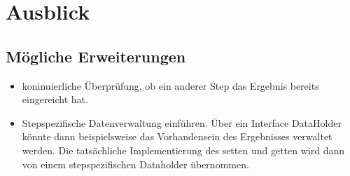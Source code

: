 \chapter{Ausblick}
\section{Mögliche Erweiterungen}
\begin{itemize}
  \item koninuierliche Überprüfung, ob ein anderer Step das Ergebnis bereits
  eingereicht hat.
  \item Stepspezifische Datenverwaltung einführen. Über ein
  Interface DataHolder könnte dann beispielsweise das Vorhandensein des
  Ergebnisses verwaltet werden. Die tatsächliche Implementierung des setten und
  getten wird dann von einem stepspezifischen Dataholder übernommen.
\end{itemize}